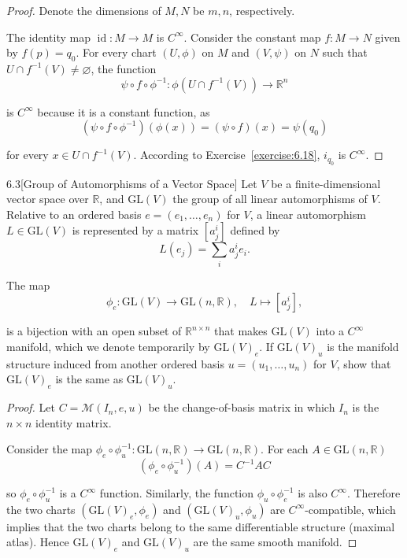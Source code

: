 \begin{proof}
	Denote the dimensions of \( M, N \) be \( m, n \), respectively.

	The identity map \( \operatorname{id}: M \to M \) is \( C^{\infty} \). Consider the constant map \( f: M \to N \) given by \( f(p) = q_{0} \). For every chart \( (U, \phi) \) on \( M \) and \( (V, \psi) \) on \( N \) such that \( U \cap f^{-1}(V) \ne \varnothing \), the function
	\[
		\psi \circ f \circ \phi^{-1}: \phi(U \cap f^{-1}(V)) \to \mathbb{R}^{n}
	\]

	is \( C^{\infty} \) because it is a constant function, as
	\[
		(\psi \circ f \circ \phi^{-1})(\phi(x)) = (\psi \circ f)(x) = \psi(q_{0})
	\]

	for every \( x \in U \cap f^{-1}(V) \). According to Exercise~\ref{exercise:6.18}, \( i_{q_{0}} \) is \( C^{\infty} \).
\end{proof}

\begin{problem}{6.3}[Group of Automorphisms of a Vector Space]
Let \(V\) be a finite-dimensional vector space over \(\mathbb{R}\), and \(\mathrm{GL}(V)\) the group of all linear automorphisms of \(V\). Relative to an ordered basis \(e = (e_{1}, \ldots, e_{n})\) for \(V\), a linear automorphism \(L \in \mathrm{GL}(V)\) is represented by a matrix \([a_{j}^{i}]\) defined by
\[
	L(e_{j}) = \sum_{i} a_{j}^{i} e_{i}.
\]

The map
\[
	\phi_{e} : \mathrm{GL}(V) \to \mathrm{GL}(n, \mathbb{R}), \quad L \mapsto [a_{j}^{i}],
\]

is a bijection with an open subset of \(\mathbb{R}^{n \times n}\) that makes \(\mathrm{GL}(V)\) into a \(C^{\infty}\) manifold, which we denote temporarily by \({\mathrm{GL}(V)}_{e}\). If \({\mathrm{GL}(V)}_{u}\) is the manifold structure induced from another ordered basis \(u = (u_{1}, \ldots, u_{n})\) for \(V\), show that \({\mathrm{GL}(V)}_{e}\) is the same as \({\mathrm{GL}(V)}_{u}\).
\end{problem}

\begin{proof}
	Let \( C = \mathcal{M}(I_{n}, e, u) \) be the change-of-basis matrix in which \( I_{n} \) is the \( n\times n \) identity matrix.

	Consider the map \( \phi_{e} \circ \phi_{u}^{-1}: \mathrm{GL}(n, \mathbb{R}) \to \mathrm{GL}(n, \mathbb{R}) \). For each \( A \in \mathrm{GL}(n, \mathbb{R}) \)
	\[
		(\phi_{e} \circ \phi_{u}^{-1})(A) = C^{-1}AC
	\]

	so \( \phi_{e} \circ \phi_{u}^{-1} \) is a \( C^{\infty} \) function. Similarly, the function \( \phi_{u} \circ \phi_{e}^{-1} \) is also \( C^{\infty} \). Therefore the two charts \( ({\mathrm{GL}(V)}_{e}, \phi_{e}) \) and \( ({\mathrm{GL}(V)}_{u}, \phi_{u}) \) are \( C^{\infty} \)-compatible, which implies that the two charts belong to the same differentiable structure (maximal atlas). Hence \( {\mathrm{GL}(V)}_{e} \) and \( {\mathrm{GL}(V)}_{u} \) are the same smooth manifold.
\end{proof}

